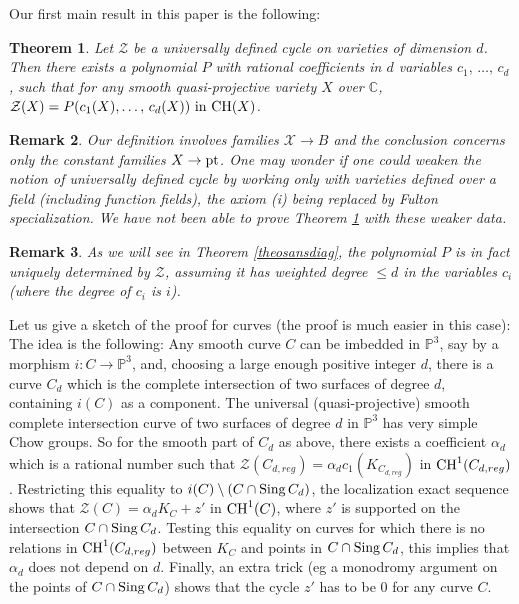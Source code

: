 \documentclass[10pt]{article}
\newtheorem{theo}{Theorem}[section]
\newtheorem{rema}[theo]{Remark}
\begin{document}
Our first main result  in this paper is the following:
\begin{theo}\label{theointro1}
Let $\mathcal{Z}$ be a universally defined cycle on varieties of dimension $d$. Then
there exists a polynomial $P$ with rational coefficients in $d$ variables
$c_1,\,\ldots,\,c_d$, such that for any smooth  quasi-projective variety $X$ over $\mathbb{C}$,
$\mathcal{Z}(X)=P(c_1(X),\ldots,\,c_d(X))\,\,{\rm in}\,\,{\rm CH}(X)$.
\end{theo}
\begin{rema}{\rm Our definition involves families $\mathcal{X}\rightarrow B$ and the conclusion concerns only the constant families $X\rightarrow {\rm pt}$. One may wonder if one could  weaken the notion of universally defined cycle by working only with varieties
defined over a field (including function fields), the axiom (i) being replaced by
Fulton specialization. We have not been able to prove Theorem \ref{theointro1} with these weaker data.}
\end{rema}
\begin{rema}{\rm As we will see in Theorem \ref{theosansdiag}, the polynomial $P$ is in fact uniquely determined by $\mathcal{Z}$, assuming it has weighted degree $\leq d$ in the variables $c_i$ (where the degree of $c_i$ is $i$).
}
\end{rema}
Let us give a sketch of the proof for curves (the proof is much easier in this case):
The idea is the following:  Any smooth curve $C$ can be imbedded in $\mathbb{P}^3$,
say by a morphism
$i:C\rightarrow \mathbb{P}^3$,  and,  choosing a  large
enough positive integer $d$, there is a curve $C_d$ which is
the complete intersection  of two surfaces of degree $d$,  containing $i(C)$ as a component.
The universal (quasi-projective) smooth complete intersection curve of two surfaces of degree $d$
in $\mathbb{P}^3$ has  very simple Chow groups. So for the smooth part of $C_d$ as above,
there exists a coefficient $\alpha_d$ which is a rational number
such that
$\mathcal{Z}({C_{d,reg}})=\alpha_d c_1(K_{C_{d,reg}})$ in ${\rm CH}^1(C_{d,reg})$. Restricting
this equality to
$i(C)\setminus (C\cap {\rm Sing}\,C_d)$, the
localization exact sequence shows
that $\mathcal{Z}(C)=\alpha_d K_C+z'$ in ${\rm CH}^1(C)$, where $z'$ is supported on the intersection $C\cap {\rm Sing}\,C_d$.
Testing this equality on curves
for which there is no relations  in ${\rm CH}^1(C_{d,reg})$
between $K_C$ and points in $C\cap {\rm Sing}\,C_d$,
this  implies that $\alpha_d$ does not depend on $d$. Finally, an extra
trick (eg a monodromy argument on the points of $C\cap {\rm Sing}\,C_d$) shows that the cycle $z'$ has to be $0$ for any curve $C$.
\end{document}
